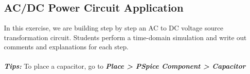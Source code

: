 

\subsection{AC/DC Power Circuit Application}
In this exercise, we are building step by step an AC to DC voltage source transformation circuit. Students perform a time-domain simulation and write out comments and explanations for each step.\\
\\
\textbf{\textit{Tips: }} To place a capacitor, go to \textbf{\textit{Place > PSpice Component > Capacitor}}

